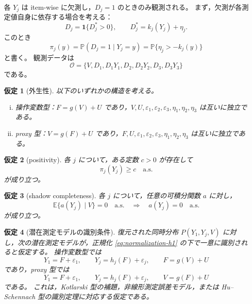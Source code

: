 \documentclass[dvipdfmx,autodetect-engine]{jsarticle}
\newtheorem{assumption}{仮定}
\newcommand{\E}{\mathbb{E}}
\newcommand{\Prb}{\mathbb{P}}
\newcommand{\1}{\mathbf{1}}
\newcommand{\calO}{\mathcal{O}}
\begin{document}
各 $Y_j$ は item-wise に欠測し，$D_j=1$ のときのみ観測される。
まず，欠測が各測定値自身に依存する場合を考える：
\begin{equation}
  D_j = \1\{D_j^*>0\},
  \qquad
  D_j^* = k_j(Y_j)+\eta_j.
  \label{eq:y-missing}
\end{equation}
このとき
\begin{equation}
  \pi_j(y) = \Prb(D_j=1\mid Y_j=y)
  = \Prb\{\eta_j>-k_j(y)\}
  \label{eq:pi-y}
\end{equation}
と書く。
観測データは
\begin{equation}
  \calO = \{V,D_1,D_1Y_1,D_2,D_2Y_2,D_3,D_3Y_3\}
  \label{eq:observed-data}
\end{equation}
である。

\begin{assumption}[外生性]
\label{ass:exogeneity}
以下のいずれかの構造を考える。
\begin{enumerate}[(i)]
  \item 操作変数型：$F=g(V)+U$ であり，$V,U,\varepsilon_1,\varepsilon_2,\varepsilon_3,\eta_1,\eta_2,\eta_3$ は互いに独立である。
  \item proxy 型：$V=g(F)+U$ であり，$F,U,\varepsilon_1,\varepsilon_2,\varepsilon_3,\eta_1,\eta_2,\eta_3$ は互いに独立である。
\end{enumerate}
\end{assumption}

\begin{assumption}[positivity]
\label{ass:positivity}
各 $j$ について，ある定数 $c>0$ が存在して
\begin{equation}
  \pi_j(Y_j) \geq c
  \quad \text{a.s.}
  \label{eq:positivity}
\end{equation}
が成り立つ。
\end{assumption}

\begin{assumption}[shadow completeness]
\label{ass:completeness-shadow}
各 $j$ について，任意の可積分関数 $a$ に対し，
\begin{equation}
  \E\{a(Y_j)\mid V\}=0 \quad \text{a.s.}
  \quad \Longrightarrow \quad
  a(Y_j)=0 \quad \text{a.s.}
  \label{eq:shadow-completeness}
\end{equation}
が成り立つ。
\end{assumption}

\begin{assumption}[潜在測定モデルの識別条件]
\label{ass:latent-identification}
復元された同時分布 $P(Y_1,Y_j,V)$ に対し，次の潜在測定モデルが，正規化 \eqref{eq:normalization-h1} の下で一意に識別されると仮定する。
操作変数型では
\begin{equation}
  Y_1=F+\varepsilon_1,
  \qquad
  Y_j=h_j(F)+\varepsilon_j,
  \qquad
  F=g(V)+U
  \label{eq:latent-id-iv}
\end{equation}
であり，proxy 型では
\begin{equation}
  Y_1=F+\varepsilon_1,
  \qquad
  Y_j=h_j(F)+\varepsilon_j,
  \qquad
  V=g(F)+U
  \label{eq:latent-id-proxy}
\end{equation}
である。
これは，Kotlarski 型の補題，非線形測定誤差モデル，または Hu--Schennach 型の識別定理に対応する仮定である。
\end{assumption}
\end{document}
